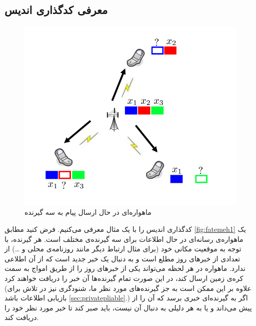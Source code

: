 \subsection{
	معرفی کدگذاری اندیس
	}
	\begin{figure}
		\centering
		\includegraphics[width=1\linewidth]{figs/chapter1/fatemeh1}
		\caption[
					ماهواره‌ای در حال ارسال پیام به سه گیرنده
		]{
			ماهواره‌ای در حال ارسال پیام به سه گیرنده
			\cite{fatemehbook}
		}
		\label{fig:fatemeh1}
	\end{figure}
کدگذاری اندیس را با یک مثال معرفی می‌کنیم. فرض کنید مطابق 
\autoref{fig:fatemeh1}
یک ماهواره‌‌ی رسانه‌ای در حال 
 اطلاعات برای سه گیرنده‌ی مختلف است. 
هر گیرنده، با توجه به موقعیت مکانی خود (برای مثال ارتباط دیگر مانند روزنامه‌ی محلی و \ldots) از تعدادی از خبرهای روز مطلع است و به دنبال یک خبر جدید است که از آن اطلاعی ندارد. ماهواره در هر لحظه می‌تواند یکی از خبرهای روز را از طریق امواج به سمت کره‌ی زمین ارسال کند، در این صورت تمام گیرنده‌ها آن خبر را دریافت خواهند کرد (علاوه بر این ممکن است به جز گیرنده‌های مورد نظر ما، شنودگری نیز در تلاش برای بازیابی اطلاعات باشد
\autoref{sec:privatepliable}.)
اگر به گیرنده‌ای خبری برسد که آن را از پیش می‌داند و یا به هر دلیلی به دنبال آن نیست، باید صبر کند تا خبر مورد نظر خود را دریافت کند.


